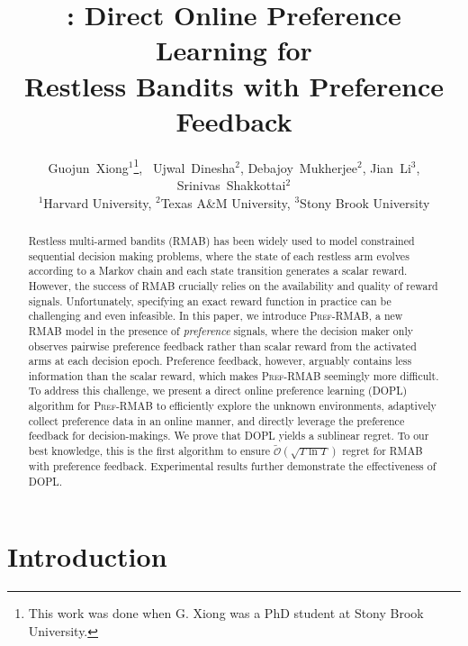 \documentclass{article} %
\title{\DOPL: Direct Online Preference Learning for \\Restless Bandits with Preference Feedback}
\author{Guojun~Xiong$^1$\thanks{This work was done when G. Xiong was a PhD student at Stony Brook University.}, ~Ujwal~Dinesha$^2$, Debajoy~Mukherjee$^2$, Jian~Li$^3$, Srinivas~Shakkottai$^2$ \\
  ${}^1$Harvard University, ${}^2$Texas A\&M University, ${}^3$Stony Brook University
  }
\newcommand{\RMABPF}{\textsc{Pref-RMAB}\xspace}
\newcommand{\DOPL}{\textsc{DOPL}\xspace}
\begin{document}
\maketitle

\begin{abstract}
Restless multi-armed bandits (RMAB) has been widely used to model constrained sequential decision making problems, where the state of each restless arm evolves according to a Markov chain and each state transition generates a scalar reward. However, the success of RMAB crucially relies on the availability and quality of reward signals. Unfortunately, specifying an exact reward function in practice can be challenging and even infeasible. In this paper, we introduce \RMABPF,  a new RMAB model in the presence of \textit{preference} signals, where the decision maker only observes pairwise preference feedback rather than scalar reward from the activated arms at each decision epoch. Preference feedback, however, arguably contains less information than the scalar reward, which makes \RMABPF seemingly more difficult. To address this challenge, we present a direct online preference learning (\DOPL) algorithm for \RMABPF to efficiently explore the unknown environments, adaptively collect preference data in an online manner, and directly leverage the preference feedback for decision-makings. We prove that \DOPL yields a sublinear regret. To our best knowledge, this is the first algorithm to ensure $\tilde{\mathcal{O}}(\sqrt{T\ln T})$ regret for RMAB with preference feedback. Experimental results further demonstrate the effectiveness of \DOPL. 
 

\end{abstract}


\section{Introduction}\label{sec:intro}
\end{document}
